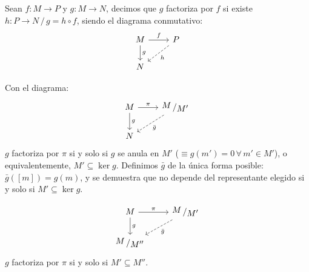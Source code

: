 \begin{defi}
Sean $f: M \longrightarrow P$ y $g: M\longrightarrow N$, decimos que $g$ factoriza por $f$ si existe $h:P\longrightarrow N \, / \, g= h\circ f$, siendo el diagrama conmutativo:
$$\bt M \arrow{r}{f} \arrow{d}{g} & P \arrow[dashed]{dl}{h} \\ N  \et$$
\end{defi}
\begin{ejem}
    Con el diagrama: 
    $$\bt M \arrow{r}{\pi} \arrow{d}{g} & \modulo{M}{M'} \arrow[dashed]{dl}{\bar g} \\ N  \et$$
    $g$ factoriza por $\pi$ si y solo si $g$ se anula en $M'$ ($\equiv g(m') = 0 \, \forall \, m' \in M
    '$), o equivalentemente, $M'\subseteq \ker g$. Definimos $\bar g$ de la \'unica forma posible:
    $\bar g ([m]) = g(m)$, y se demuestra que no depende del representante elegido si y solo si $ M ' \subseteq \ker g$.
\end{ejem}
\begin{ejem}
        $$\bt M \arrow{r}{\pi} \arrow{d}{g} & \modulo{M}{M'} \arrow[dashed]{dl}{\bar g} \\ \modulo{M}{M''}  \et$$
    $g$ factoriza por $\pi$ si y solo si $M' \subseteq M''$. 
\end{ejem}

